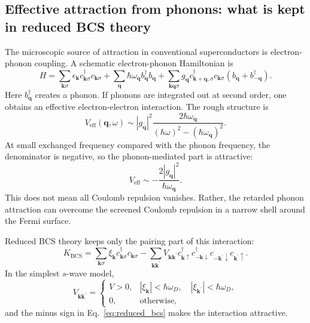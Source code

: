 \documentclass[11pt]{article}
\numberwithin{equation}{section}
\newcommand{\qvec}{\bm{q}}
\newcommand{\kvec}{\bm{k}}
\newcommand{\kvecp}{\bm{k}^{\prime}}
\begin{document}
\subsection{Effective attraction from phonons: what is kept in reduced BCS theory}

The microscopic source of attraction in conventional superconductors is electron-phonon coupling. A schematic electron-phonon Hamiltonian is
\begin{equation}
H=\sum_{\kvec\sigma}\epsilon_{\kvec} c_{\kvec\sigma}^{\dagger}c_{\kvec\sigma}
+\sum_{\qvec}\hbar\omega_{\qvec} b_{\qvec}^{\dagger}b_{\qvec}
+\sum_{\kvec\qvec\sigma}g_{\qvec} c_{\kvec+\qvec,\sigma}^{\dagger}c_{\kvec\sigma}(b_{\qvec}+b_{-\qvec}^{\dagger}).
\end{equation}
Here $b_{\qvec}^{\dagger}$ creates a phonon. If phonons are integrated out at second order, one obtains an effective electron-electron interaction. The rough structure is
\begin{equation}
V_{\mathrm{eff}}(\qvec,\omega)\sim |g_{\qvec}|^2\frac{2\hbar\omega_{\qvec}}{(\hbar\omega)^2-(\hbar\omega_{\qvec})^2}.
\end{equation}
At small exchanged frequency compared with the phonon frequency, the denominator is negative, so the phonon-mediated part is attractive:
\begin{equation}
V_{\mathrm{eff}}\sim -\frac{2|g_{\qvec}|^2}{\hbar\omega_{\qvec}}.
\end{equation}
This does not mean all Coulomb repulsion vanishes. Rather, the retarded phonon attraction can overcome the screened Coulomb repulsion in a narrow shell around the Fermi surface.

Reduced BCS theory keeps only the pairing part of this interaction:
\begin{equation}
K_{\mathrm{BCS}}=\sum_{\kvec\sigma}\xi_{\kvec} c_{\kvec\sigma}^{\dagger}c_{\kvec\sigma}
-\sum_{\kvec\kvecp}V_{\kvec\kvecp}
 c_{\kvec\uparrow}^{\dagger}c_{-\kvec\downarrow}^{\dagger}c_{-\kvecp\downarrow}c_{\kvecp\uparrow}.
\label{eq:reduced_bcs}
\end{equation}
In the simplest $s$-wave model,
\begin{equation}
V_{\kvec\kvecp}=
\begin{cases}
V>0, & |\xi_{\kvec}|<\hbar\omega_D,\quad |\xi_{\kvecp}|<\hbar\omega_D,\\
0, & \text{otherwise},
\end{cases}
\end{equation}
and the minus sign in Eq.~\eqref{eq:reduced_bcs} makes the interaction attractive.
\end{document}
